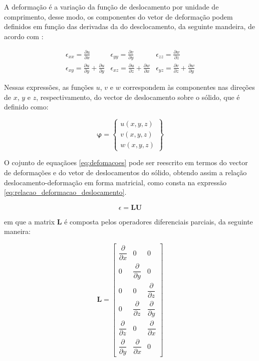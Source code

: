 A deformação é a variação da função de deslocamento por unidade de comprimento, desse modo, os componentes do vetor de deformação podem definidos em função das derivadas da do desclocamento, da seguinte mandeira, de acordo com :

\begin{equation} \label{eq:defomacoes}
    \begin{matrix}
        \epsilon_{xx} = \frac{\partial u}{\partial x} &
        \epsilon_{yy} = \frac{\partial v}{\partial y} &
        \epsilon_{zz} = \frac{\partial w}{\partial z} \\
        \epsilon_{xy} = \frac{\partial u}{\partial y} + \frac{\partial u}{\partial y} &
        \epsilon_{xz} = \frac{\partial u}{\partial z} + \frac{\partial w}{\partial x} &
        \epsilon_{yz} = \frac{\partial v}{\partial z} + \frac{\partial w}{\partial y}
    \end{matrix}
\end{equation}

Nessas expressões, as funções $u$, $v$ e $w$ correspondem às componentes nas direções de $x$, $y$ e $z$, respectivamento, do vector de deslocamento sobre o sólido, que é definido como:

\begin{equation} \label{eq:funcao_deslocamento}
    \mathbf{\varphi} = \begin{Bmatrix}
        u(x,y,z) \\
        v(x,y,z) \\
        w(x,y,z)
    \end{Bmatrix}
\end{equation}


O cojunto de equaçãoes \ref{eq:defomacoes} pode ser reescrito em termos do vector de deformações e do vetor de deslocamentos do sólido, obtendo assim a relação deslocamento-deformação em forma matricial, como consta na expressão \ref{eq:relacao_deformacao_deslocamento}.

\begin{equation} \label{eq:relacao_deformacao_deslocamento}
    \epsilon = \mathbf{L} \mathbf{U}
\end{equation}

em que a matrix $\mathbf{L}$ é composta pelos operadores diferenciais parciais, da seguinte maneira:

\begin{equation}
    \mathbf{L} = \begin{bmatrix}
        \dfrac{\partial}{\partial x} & 0 & 0 \\
        0 & \dfrac{\partial}{\partial y} & 0 \\
        0 & 0 & \dfrac{\partial}{\partial z} \\
        0 & \dfrac{\partial}{\partial z} & \dfrac{\partial}{\partial y} \\
        \dfrac{\partial}{\partial z} & 0 & \dfrac{\partial}{\partial x} \\
        \dfrac{\partial}{\partial y} & \dfrac{\partial}{\partial x} & 0
    \end{bmatrix}
\end{equation}

